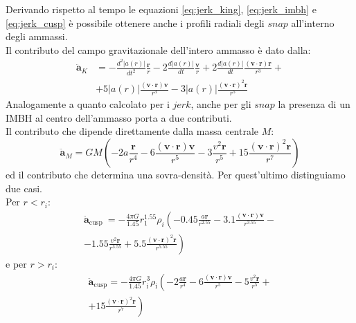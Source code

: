 Derivando rispetto al tempo le equazioni \ref{eq:jerk_king}, \ref{eq:jerk_imbh} e \ref{eq:jerk_cusp} è possibile ottenere anche i profili radiali degli $snap$ all'interno degli ammassi.\\
Il contributo del campo gravitazionale dell'intero ammasso è dato dalla:
\begin{equation}
\begin{aligned}
\ddot{\mathbf{a}}_{K}&=-\frac{d^{2}|a(r)|}{d t^{2}} \frac{\mathbf{r}}{r}-2 \frac{d|a(r)|}{d t} \frac{\mathbf{v}}{r}+2 \frac{d|a(r)|}{d t} \frac{(\mathbf{v} \cdot \mathbf{r}) \mathbf{r}}{r^{3}}+\\
&+5|a(r)| \frac{(\mathbf{v} \cdot \mathbf{r}) \mathbf{v}}{r^{3}}-3|a(r)| \frac{(\mathbf{v} \cdot \mathbf{r})^{2} \mathbf{r}}{r^{5}}
\end{aligned}
\label{eq:snap_king}
\end{equation}
Analogamente a quanto calcolato per i $jerk$, anche per gli $snap$ la presenza di un IMBH al centro dell'ammasso porta a due contributi.\\
Il contributo che dipende direttamente dalla massa centrale $M$:
\begin{equation}
\ddot{\mathbf{a}}_{M}=G M\left(-2 a \frac{\mathbf{r}}{r^{4}}-6 \frac{(\mathbf{v} \cdot \mathbf{r}) \mathbf{v}}{r^{5}}-3 \frac{v^{2} \mathbf{r}}{r^{5}}+15 \frac{(\mathbf{v} \cdot \mathbf{r})^{2} \mathbf{r}}{r^{7}}\right)
\label{eq:snap_imbh}
\end{equation}
ed il contributo che determina una sovra-densità. Per quest'ultimo distinguiamo due casi.\\ 
Per $r<r_{i}$:
\begin{equation}
\begin{array}{r}
\ddot{\mathbf{a}}_{\text {cusp }}=-\frac{4 \pi G}{1.45} r_{1}^{1.55} \rho_{i} \left(-0.45 \frac{a \mathbf{r}}{r^{2.55}}-3.1 \frac{(\mathbf{v} \cdot \mathbf{r}) \mathbf{v}}{r^{3.55}}-\right.\\
\left.-1.55 \frac{v^{2} \mathbf{r}}{r^{3.55}}+5.5 \frac{(\mathbf{v} \cdot \mathbf{r})^{2} \mathbf{r}}{r^{5.55}}\right)
\end{array}
\label{eq:snap_cusp1}
\end{equation}
e per $r>r_{i}$:
\begin{equation}
\begin{array}{r}
\ddot{\mathbf{a}}_{\mathrm{cusp}}=-\frac{4 \pi G}{1.45} r_{\mathrm{i}}^{3} \rho_{\mathrm{i}}\left(-2 \frac{a \mathbf{r}}{r^{4}}-6 \frac{(\mathbf{v} \cdot \mathbf{r}) \mathbf{v}}{r^{5}}-5 \frac{v^{2} \mathbf{r}}{r^{5}}+\right. \\
\left.+15 \frac{(\mathbf{v} \cdot \mathbf{r})^{2} \mathbf{r}}{r^{7}}\right)
\end{array}
\end{equation}

